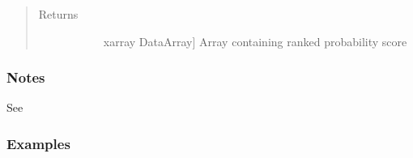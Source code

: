 \documentclass[letterpaper,10pt,english]{sphinxmanual}
\begin{document}
\begin{fulllineitems}
\begin{quote}
\begin{description}
\begin{description}
\end{description}

\item[{Returns}] \leavevmode\begin{description}
\item[{}] \leavevmode{[}xarray DataArray{]}
Array containing ranked probability score

\end{description}

\end{description}\end{quote}
\subsubsection*{Notes}

See 
\subsubsection*{Examples}


\end{fulllineitems}
\end{document}
